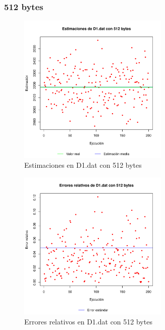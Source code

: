 \subsubsection{512 bytes}
\begin{figure}[h!]
    \centering
        \includegraphics[width=0.64\textwidth]{../figs/D1/plot_estimation_512.pdf}
        \caption{Estimaciones en D1.dat con 512 bytes}
    \label{figura:D1_estimation_512}
\end{figure}

\begin{figure}[h!]
    \centering
        \includegraphics[width=0.64\textwidth]{../figs/D1/plot_errors_512.pdf}
        \caption{Errores relativos en D1.dat con 512 bytes}
    \label{figura:D1_errors_512}
\end{figure}

